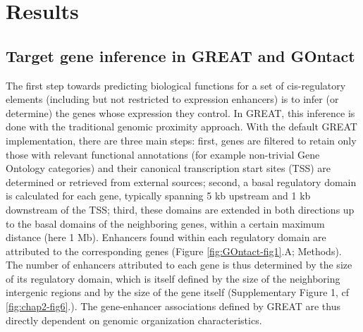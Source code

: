 \section{Results}
\subsection{Target gene inference in GREAT and GOntact}

The first step towards predicting biological functions for a set of \gls{cis}-regulatory elements (including but not restricted to expression enhancers) is to infer (or determine) the genes whose expression they control. In GREAT, this inference is done with the traditional genomic proximity approach. With the default GREAT implementation, there are three main steps: first, genes are filtered to retain only those with relevant functional annotations (for example non-trivial Gene Ontology categories) and their canonical transcription start sites (TSS) are determined or retrieved from external sources; second, a basal regulatory domain is calculated for each gene, typically spanning 5 kb upstream and 1 kb downstream of the TSS; third, these domains are extended in both directions up to the basal domains of the neighboring genes, within a certain maximum distance (here 1 Mb). Enhancers found within each regulatory domain are attributed to the corresponding genes (Figure \ref{fig:GOntact-fig1}.A; Methods). The number of enhancers attributed to each gene is thus determined by the size of its regulatory domain, which is itself defined by the size of the neighboring intergenic regions and by the size of the gene itself (Supplementary Figure 1, cf \ref{fig:chap2-fig6}.). The gene-enhancer associations defined by GREAT are thus directly dependent on genomic organization characteristics. \\

